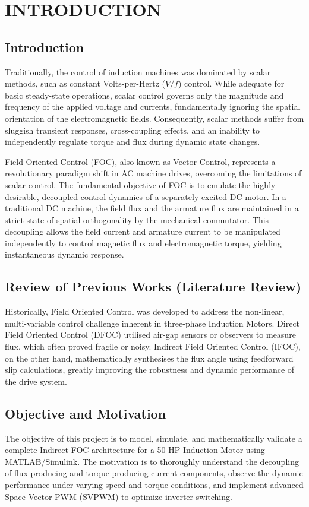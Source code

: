 \documentclass[12pt,a4paper]{report}
\begin{document}
\chapter{INTRODUCTION}
\section{Introduction}
Traditionally, the control of induction machines was dominated by scalar methods, such as constant Volts-per-Hertz ($V/f$) control. While adequate for basic steady-state operations, scalar control governs only the magnitude and frequency of the applied voltage and currents, fundamentally ignoring the spatial orientation of the electromagnetic fields. Consequently, scalar methods suffer from sluggish transient responses, cross-coupling effects, and an inability to independently regulate torque and flux during dynamic state changes.

Field Oriented Control (FOC), also known as Vector Control, represents a revolutionary paradigm shift in AC machine drives, overcoming the limitations of scalar control. The fundamental objective of FOC is to emulate the highly desirable, decoupled control dynamics of a separately excited DC motor. In a traditional DC machine, the field flux and the armature flux are maintained in a strict state of spatial orthogonality by the mechanical commutator. This decoupling allows the field current and armature current to be manipulated independently to control magnetic flux and electromagnetic torque, yielding instantaneous dynamic response.

\section{Review of Previous Works (Literature Review)}
Historically, Field Oriented Control was developed to address the non-linear, multi-variable control challenge inherent in three-phase Induction Motors. Direct Field Oriented Control (DFOC) utilised air-gap sensors or observers to measure flux, which often proved fragile or noisy. Indirect Field Oriented Control (IFOC), on the other hand, mathematically synthesises the flux angle using feedforward slip calculations, greatly improving the robustness and dynamic performance of the drive system.

\section{Objective and Motivation}
The objective of this project is to model, simulate, and mathematically validate a complete Indirect FOC architecture for a 50 HP Induction Motor using MATLAB/Simulink. The motivation is to thoroughly understand the decoupling of flux-producing and torque-producing current components, observe the dynamic performance under varying speed and torque conditions, and implement advanced Space Vector PWM (SVPWM) to optimize inverter switching.
\end{document}
